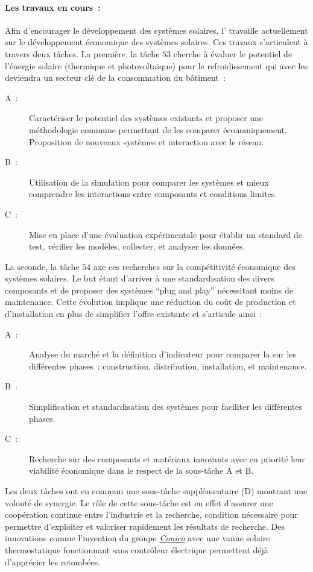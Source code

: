 \paragraph{Les travaux en cours~:} %
\label{par:les_travaux_en_cours}
Afin d’encourager le développement des systèmes solaires, l’ travaille
actuellement sur le développement économique des systèmes solaires. Ces travaux s’articulent
à travers deux tâches. La première, la tâche $53$ cherche à évaluer le potentiel
de l’énergie solaire (thermique et photovoltaïque) pour le refroidissement qui
avec les  deviendra un secteur clé de la consommation du bâtiment~:
\begin{description}
    \item[A~:] Caractériser le potentiel des systèmes existants et proposer une méthodologie
                commune permettant de les comparer économiquement. Proposition de nouveaux
                systèmes et interaction avec le réseau.
    \item[B~:] Utilisation de la simulation pour comparer les systèmes et mieux
                comprendre les interactions entre composants et conditions limites.
    \item[C~:] Mise en place d’une évaluation expérimentale pour établir un standard
                de test, vérifier les modèles, collecter, et analyser les données.
\end{description}
La seconde, la tâche $54$ axe ces recherches sur la compétitivité économique des
systèmes solaires. Le but étant d’arriver à une standardisation des
divers composants et de proposer des systèmes \enquote{plug and play} nécessitant
moins de maintenance. Cette évolution implique une réduction du coût de production
et d’installation en plus de simplifier l’offre existante et s’articule ainsi~:
\begin{description}
    \item [A~:] Analyse du marché et la définition d’indicateur pour comparer la
                sur les différentes phases~: construction, distribution, installation, et maintenance.
    \item [B~:] Simplification et standardisation des systèmes pour faciliter les différentes
                phases.
    \item [C~:] Recherche sur des composants et matériaux innovants avec en priorité
                leur viabilité économique dans le respect de la sous-tâche A et B.
\end{description}
Les deux tâches ont en commun une sous-tâche supplémentaire (D) montrant une volonté
de synergie. Le rôle de cette sous-tâche est en effet d’assurer une coopération
continue entre l’industrie et la recherche, condition nécessaire
pour permettre d’exploiter et valoriser rapidement les résultats de recherche.
Des innovations comme l’invention du groupe \href{http://www.iea-shc.org/article?NewsID=177}{\textit{Conico}}
avec une vanne solaire thermostatique fonctionnant sans contrôleur électrique permettent déjà d’apprécier les
retombées.

